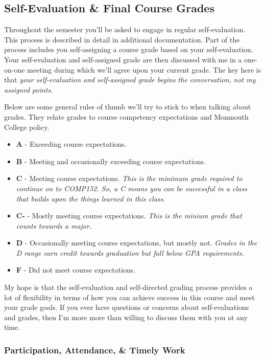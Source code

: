 \documentclass[10pt]{article}
\begin{document}
\subsection{Self-Evaluation \& Final Course Grades}

Throughout the semester you'll be asked to engage in regular self-evaluation. This process is described in
detail in additional documentation. Part of the process includes you self-assigning a course grade based on
your self-evaluation. Your self-evaluation and self-assigned grade are then discussed with me in a one-on-one
meeting during which we'll agree upon your current grade. The key here is that \textit{your self-evaluation
and self-assigned grade begins the conversation, not my assigned points.}

Below are some general rules of thumb we'll try to stick to when talking about grades. They relate grades to
course competency expectations and Monmouth College policy.
\begin{itemize}
  \item \textbf{A} - Exceeding course expectations.
  \item \textbf{B} - Meeting and occasionally exceeding course expectations.
  \item \textbf{C} - Meeting course expectations. \textit{This is the minimum grade required to continue on to COMP152. So, a C means you can be successful in a class that builds upon the things learned in this class.}
  \item \textbf{C-} - Mostly meeting course expectations. \textit{This is the minium grade that counts towards a major.}
  \item \textbf{D} - Occasionally meeting course expectations, but mostly not. \textit{Grades in the D range earn credit towards graduation but fall below GPA requirements.}
  \item \textbf{F} - Did not meet course expectations.
\end{itemize}

My hope is that the self-evaluation and self-directed grading process provides a lot of flexibility in terms
of how you can achieve success in this course and meet your grade goals. If you ever have questions or concerns
about self-evaluations and grades, then I'm more more than willing to discuss them with you at any time.

\subsubsection{Participation, Attendance, \& Timely Work}
\end{document}

